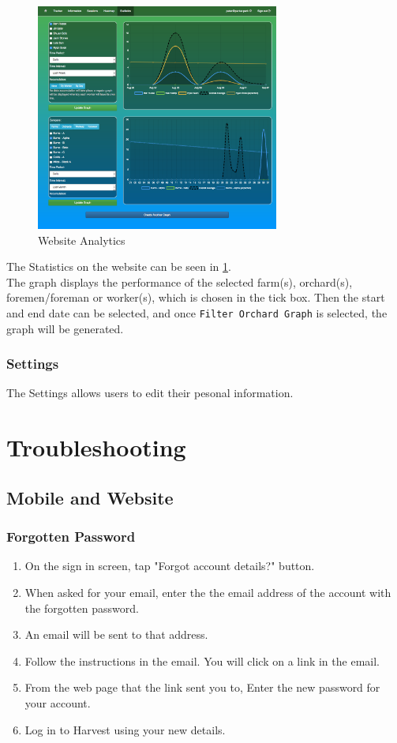 \documentclass[11pt]{article}
\begin{document}
\begin{figure}
 \centering
 \includegraphics[width=8cm, keepaspectratio]{Images/UsingSystem/WebStats.png}
 \caption{Website Analytics}
 \label{webStatsImg}
\end{figure}

The Statistics on the website can be seen in \ref{webStatsImg}. \\
The graph displays the performance of the selected farm(s), orchard(s), foremen/foreman or worker(s), which is chosen in the tick box. Then the start and end date can be selected, and once \texttt{Filter Orchard Graph} is selected, the graph will be generated.\\

\subsubsection{Settings}
\label{webSettings}

The Settings allows users to edit their pesonal information.

\newpage
\section{Troubleshooting}

\subsection{Mobile and Website}

\subsubsection{Forgotten Password}
\begin{enumerate}
\item On the sign in screen, tap "Forgot account details?" button.
\item When asked for your email, enter the the email address of the account with the forgotten password.
\item An email will be sent to that address.
\item Follow the instructions in the email. You will click on a link in the email.
\item From the web page that the link sent you to, Enter the new password for your account.
\item Log in to Harvest using your new details.
\end{enumerate}
\end{document}
